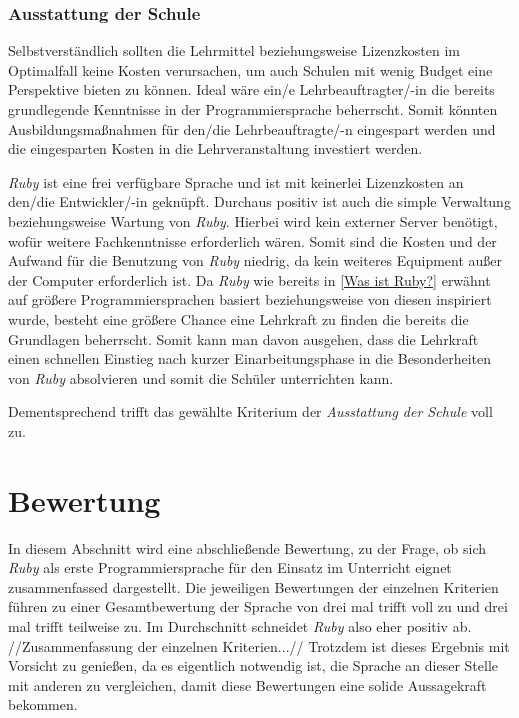 \documentclass[12pt,DIV=14, version=first, BCOR=10mm,a4paper,twoside,parskip=half-,headsepline,headinclude]{scrartcl}
\begin{document}
\subsubsection{Ausstattung der Schule}
\begin{flushleft}
Selbstverständlich sollten die Lehrmittel beziehungsweise Lizenzkosten im Optimalfall keine Kosten verursachen, um auch Schulen mit wenig Budget eine Perspektive bieten zu können. Ideal wäre ein/e Lehrbeauftragter/-in die bereits grundlegende Kenntnisse in der Programmiersprache beherrscht. Somit könnten Ausbildungsmaßnahmen für den/die Lehrbeauftragte/-n eingespart werden und die eingesparten Kosten in die Lehrveranstaltung investiert werden.

\textit{\glqq Ruby\grqq} ist eine frei verfügbare Sprache und ist mit keinerlei Lizenzkosten an den/die Entwickler/-in geknüpft. Durchaus positiv ist auch die simple Verwaltung beziehungsweise Wartung von \textit{\glqq Ruby\grqq}. Hierbei wird kein externer Server benötigt, wofür weitere Fachkenntnisse erforderlich wären. Somit sind die Kosten und der Aufwand für die Benutzung von \textit{\glqq Ruby\grqq} niedrig, da kein weiteres Equipment außer der Computer erforderlich ist. Da \textit{\glqq Ruby\grqq} wie bereits in \ref{Was ist Ruby?} erwähnt auf größere Programmiersprachen basiert beziehungsweise von diesen inspiriert wurde, besteht eine größere Chance eine Lehrkraft zu finden die bereits die Grundlagen beherrscht. Somit kann man davon ausgehen, dass die Lehrkraft einen schnellen Einstieg nach kurzer Einarbeitungsphase in die Besonderheiten von \textit{\glqq Ruby\grqq} absolvieren und somit die Schüler unterrichten kann.

Dementsprechend trifft das gewählte Kriterium der \textit{Ausstattung der Schule} voll zu.
\end{flushleft}

\section{Bewertung}
\begin{flushleft}
In diesem Abschnitt wird eine abschließende Bewertung, zu der Frage, ob sich \textit{\glqq Ruby\grqq} als erste Programmiersprache für den Einsatz im Unterricht eignet zusammenfassed dargestellt. Die jeweiligen Bewertungen der einzelnen Kriterien führen zu einer Gesamtbewertung der Sprache von drei mal
{\glqq trifft voll zu\grqq} und drei mal {\glqq trifft teilweise zu\grqq}. Im Durchschnitt schneidet \textit{\glqq Ruby\grqq} also eher positiv ab.
//Zusammenfassung der einzelnen Kriterien...//
Trotzdem ist dieses Ergebnis mit Vorsicht zu genießen, da es eigentlich notwendig ist, die Sprache an dieser Stelle mit anderen zu vergleichen, damit diese Bewertungen eine solide Aussagekraft bekommen.
\end{flushleft}
\end{document}
